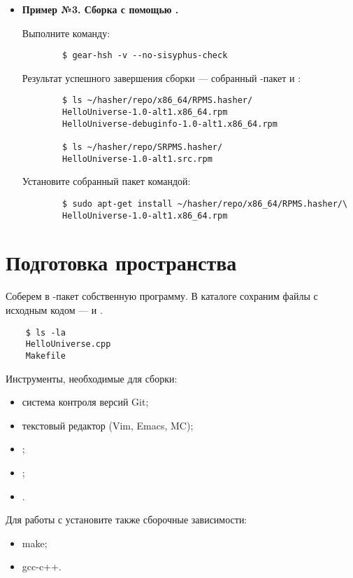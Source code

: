 \begin{itemize}
	\item \textbf{Пример №3. Сборка с помощью .}
	
	Выполните команду: 
	\begin{verbatim}
		$ gear-hsh -v --no-sisyphus-check 
	\end{verbatim}
	
	Результат успешного завершения сборки --- собранный -пакет и :
	\begin{verbatim}
		$ ls ~/hasher/repo/x86_64/RPMS.hasher/
		HelloUniverse-1.0-alt1.x86_64.rpm
		HelloUniverse-debuginfo-1.0-alt1.x86_64.rpm
		
		$ ls ~/hasher/repo/SRPMS.hasher/
		HelloUniverse-1.0-alt1.src.rpm
	\end{verbatim} 
	
	Установите собранный пакет командой: 
	\begin{verbatim}
		$ sudo apt-get install ~/hasher/repo/x86_64/RPMS.hasher/\
		HelloUniverse-1.0-alt1.x86_64.rpm
	\end{verbatim}
\end{itemize} 


\section{Подготовка пространства}
Соберем в -пакет собственную программу. В каталоге сохраним файлы с исходным кодом ---  и .
\begin{verbatim}
	$ ls -la
	HelloUniverse.cpp
	Makefile
\end{verbatim}


Инструменты, необходимые для сборки: 
\begin{itemize}
	\item система контроля версий Git;
	\item текстовый редактор (Vim, Emacs, MC);
	\item {};
	\item {};
	\item {}.
\end{itemize}

Для работы с  установите также сборочные зависимости:
\begin{itemize}
	\item make;
	\item gcc-c++.
\end{itemize} 

